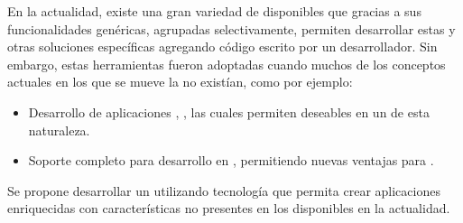 		En la actualidad, existe una gran variedad de \frameworksPC disponibles que gracias a sus funcionalidades genéricas, agrupadas selectivamente, permiten  desarrollar estas y otras soluciones específicas agregando código escrito por un desarrollador. Sin embargo, estas herramientas fueron adoptadas cuando muchos de los conceptos actuales en los que se mueve la \internetINT no existían, como por ejemplo:

		\begin{itemize}
			\item
				Desarrollo de aplicaciones \realTimeINT, \reactive, las cuales permiten deseables \featuresCPT en un \frameworkPC de esta naturaleza.
			\item
				Soporte completo para desarrollo en \devicesINT \mobilesINT, permitiendo nuevas ventajas para \ecommerceCOM \cite{cook2015mobile}.
		\end{itemize}



		Se propone desarrollar un \frameworkPC \freePC \openSourcePC utilizando tecnología \webINT que permita crear aplicaciones enriquecidas con características no presentes en los \frameworksPC \ecommerceCOM \freePC \openSourcePC disponibles en la actualidad.



